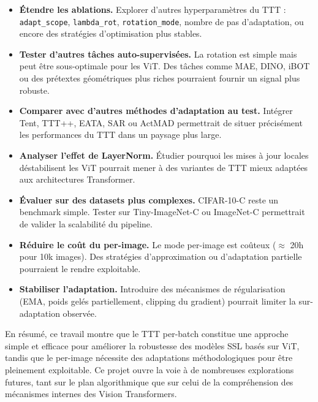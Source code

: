 \documentclass[12pt,a4paper]{report}
\begin{document}
	\begin{itemize}
		\item \textbf{Étendre les ablations.}  
		Explorer d’autres hyperparamètres du TTT : \texttt{adapt\_scope}, \texttt{lambda\_rot}, \texttt{rotation\_mode}, nombre de pas d’adaptation, ou encore des stratégies d’optimisation plus stables.
		
		\item \textbf{Tester d’autres tâches auto-supervisées.}  
		La rotation est simple mais peut être sous-optimale pour les ViT.  
		Des tâches comme MAE, DINO, iBOT ou des prétextes géométriques plus riches pourraient fournir un signal plus robuste.
		
		\item \textbf{Comparer avec d’autres méthodes d’adaptation au test.}  
		Intégrer Tent, TTT++, EATA, SAR ou ActMAD permettrait de situer précisément les performances du TTT dans un paysage plus large.
		
		\item \textbf{Analyser l’effet de LayerNorm.}  
		Étudier pourquoi les mises à jour locales déstabilisent les ViT pourrait mener à des variantes de TTT mieux adaptées aux architectures Transformer.
		
		\item \textbf{Évaluer sur des datasets plus complexes.}  
		CIFAR-10-C reste un benchmark simple.  
		Tester sur Tiny-ImageNet-C ou ImageNet-C permettrait de valider la scalabilité du pipeline.
		
		\item \textbf{Réduire le coût du per-image.}  
		Le mode per-image est coûteux ($\approx$ 20h pour 10k images).  
		Des stratégies d’approximation ou d’adaptation partielle pourraient le rendre exploitable.
		
		\item \textbf{Stabiliser l’adaptation.}  
		Introduire des mécanismes de régularisation (EMA, poids gelés partiellement, clipping du gradient) pourrait limiter la sur-adaptation observée.
	\end{itemize}
	
	En résumé, ce travail montre que le TTT per-batch constitue une approche simple et efficace pour améliorer la robustesse des modèles SSL basés sur ViT, tandis que le per-image nécessite des adaptations méthodologiques pour être pleinement exploitable.  
	Ce projet ouvre la voie à de nombreuses explorations futures, tant sur le plan algorithmique que sur celui de la compréhension des mécanismes internes des Vision Transformers.
	
\end{document}
